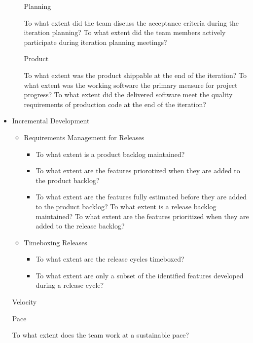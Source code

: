 \begin{appendices}
\begin{itemize}
\begin{itemize}
			\addition Planning
				\begin{itemize}
					\addition To what extent did the team discuss the acceptance criteria during the iteration planning?
					\addition To what extent did the team members actively participate during iteration planning meetings?
				\end{itemize}
			\addition Product
				\begin{itemize}
					\addition To what extent was the product shippable at the end of the iteration?
					\addition To what extent was the working software the primary measure for project progress?
					\addition To what extent did the delivered software meet the quality requirements of production code at the end of the iteration?
				\end{itemize}
		\end{itemize}
	\item Incremental Development
		\begin{itemize}
			\item Requirements Management for Releases
				\begin{itemize}
					\item To what extent is a product backlog maintained?
					\item To what extent are the features priorotized when they are added to the product backlog?
					\item To what extent are the features fully estimated before they are added to the product backlog?
					\addition To what extent is a release backlog maintained?
					\addition To what extent are the features prioritized when they are added to the release backlog?
				\end{itemize}
			\item Timeboxing Releases
				\begin{itemize}
					\item To what extent are the release cycles timeboxed?
					\item To what extent are only a subset of the identified features developed during a release cycle?
				\end{itemize}
		\end{itemize}
	\addition Velocity
		\begin{itemize}
			\addition Pace
				\begin{itemize}
					\addition To what extent does the team work at a sustainable pace?

\end{itemize}
\end{itemize}
\end{itemize}
\end{appendices}
